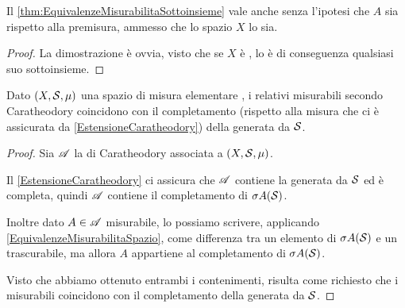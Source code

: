 \begin{corollary}\label{EquivalenzeMisurabilitaSpazio}
	Il \cref{thm:EquivalenzeMisurabilitaSottoinsieme} vale anche senza l'ipotesi che $A$ sia \sigfin[o] rispetto alla premisura, ammesso che lo spazio $X$ lo sia.
\end{corollary}
\begin{proof}
	La dimostrazione è ovvia, visto che se $X$ è \sigfin[o], lo è di conseguenza qualsiasi suo sottoinsieme.
\end{proof}

\begin{proposition}\label{prop:CaratheodoryCompletamentoSigAlg}
	Dato $(X,\S,\mu)$ una spazio di misura elementare \sigfin[o], i relativi misurabili secondo Caratheodory coincidono con il completamento (rispetto alla misura che ci è assicurata da \cref{EstensioneCaratheodory}) della \sigalg{} generata da $\S$.
\end{proposition}
\begin{proof}
	Sia $\A$ la \sigalg{} di Caratheodory associata a $(X,\S,\mu)$.
	
	Il \cref{EstensioneCaratheodory} ci assicura che $\A$ contiene la \sigalg{} generata da $\S$ ed è completa, quindi $\A$ contiene il completamento di $\sigma A(\S)$.
	
	Inoltre dato $A\in\A$ misurabile, lo possiamo scrivere, applicando \cref{EquivalenzeMisurabilitaSpazio}, come differenza tra un elemento di $\sigma A(\S)$ e un trascurabile, ma allora $A$ appartiene al completamento di $\sigma A(\S)$.
	
	Visto che abbiamo ottenuto entrambi i contenimenti, risulta come richiesto che i misurabili coincidono con il completamento della \sigalg{} generata da $\S$.
\end{proof}




